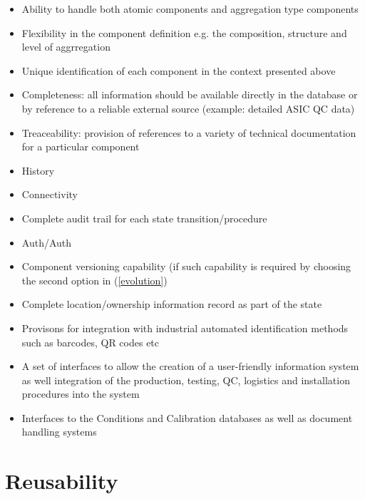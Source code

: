 \documentclass[pdftex,12pt,letter]{article}
\begin{document}
\begin{itemize}

\item Ability to handle both atomic components and aggregation type components

\item Flexibility in the component definition e.g. the composition, structure and level of aggrregation

\item Unique identification of each component in the context presented above

\item Completeness: all information should be available directly in the database or by reference to a reliable external source
(example: detailed ASIC QC data)

\item Treaceability: provision of references to a variety of technical documentation for a particular component

\item History

\item Connectivity

\item Complete audit trail for each state transition/procedure

\item Auth/Auth

\item Component versioning capability (if such capability is required by choosing the second option in (\ref{evolution})

\item Complete location/ownership information record as part of the state

\item Provisons for integration with industrial automated identification methods such as barcodes, QR codes etc

\item A set of interfaces to allow the creation of a user-friendly information system as well integration of the production, testing, QC,
logistics and installation procedures into the system

\item Interfaces to the Conditions and Calibration databases as well as document handling systems

\end{itemize}


\section{Reusability}
\end{document}
